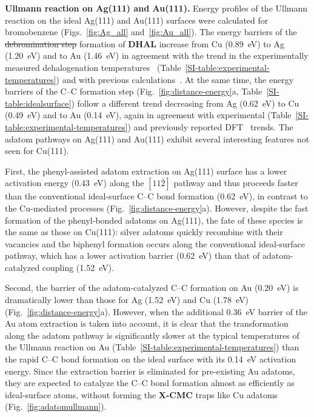 \documentclass[aps,prb,amsmath,amssymb,11pt]{revtex4-1}
\newcommand{\zhzh}{\color{blue}}
\begin{document}
\textbf{Ullmann reaction on Ag(111) and Au(111).}
%
Energy profiles of the Ullmann reaction on the ideal Ag(111) and Au(111) surfaces were calculated for bromobenzene (Figs.~\ref{fig:Ag_all} and~\ref{fig:Au_all}). 
The energy barriers of the \sout{debromination step} {\zhzh formation of \textbf{DHAL}} increase from Cu (\SI{0.89}{\electronvolt}) to Ag (\SI{1.20}{\electronvolt}) and to Au (\SI{1.46}{\electronvolt}) in agreement with the trend in the experimentally measured dehalogenation temperatures~\cite{ullmann_52,ullmann_87,ullmann_67} (Table~\ref{SI-table:experimental-temperatures}) and with previous calculations~\cite{jacs2013}.
At the same time, the energy barriers of the C--C formation step (Fig.~\ref{fig:distance-energy}a, Table~\ref{SI-table:idealsurface}) follow a different trend decreasing from Ag (\SI{0.62}{\electronvolt}) to Cu (\SI{0.49}{\electronvolt}) and to Au (\SI{0.14}{\electronvolt}), again in agreement with experimental (Table~\ref{SI-table:experimental-temperatures}) and previously reported DFT~\cite{jacs2013} trends. The adatom pathways on Ag(111) and Au(111) exhibit several interesting features not seen for Cu(111).

First, the phenyl-assisted adatom extraction on Ag(111) surface has a lower activation energy (\SI{0.43}{\electronvolt}) along the $[11\bar{2}]$ pathway and thus proceeds faster than the conventional ideal-surface C--C bond formation (\SI{0.62}{\electronvolt}), in contrast to the Cu-mediated processes (Fig.~\ref{fig:distance-energy}a). However, despite the fast formation of the phenyl-bonded adatoms on Ag(111), the fate of these species is the same as those on Cu(111): silver adatoms quickly recombine with their vacancies and the biphenyl formation occurs along the conventional ideal-surface pathway, which has a lower activation barrier (\SI{0.62}{\electronvolt}) than that of adatom-catalyzed coupling (\SI{1.52}{\electronvolt}).

Second, the barrier of the adatom-catalyzed C--C formation on Au (\SI{0.20}{\electronvolt}) is dramatically lower than those for Ag (\SI{1.52}{\electronvolt}) and Cu (\SI{1.78}{\electronvolt})  (Fig.~\ref{fig:distance-energy}a). 
However, when the additional \SI{0.36}{\electronvolt} barrier of the Au atom extraction is taken into account, it is clear that
the transformation along the adatom pathway is significantly slower at the typical temperatures of the Ullmann reaction on Au (Table~\ref{SI-table:experimental-temperatures}) than the rapid C--C bond formation on the ideal surface with its \SI{0.14}{\electronvolt} activation energy. 
Since the extraction barrier is eliminated for pre-existing Au adatoms, they are expected to catalyze the C--C bond formation almost as efficiently as ideal-surface atoms, without forming the \textbf{X-CMC} traps like Cu adatoms~\cite{ullmann_65} (Fig.~\ref{fig:adatomullmann}).
\end{document}
